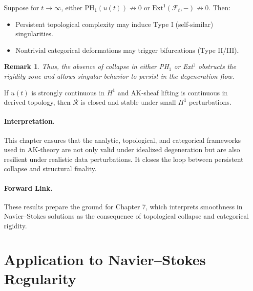 \documentclass[11pt]{article}
\newtheorem{remark}[theorem]{Remark}
\begin{document}
\begin{proposition}
Suppose for $t \to \infty$, either $\mathrm{PH}_1(u(t)) \not\to 0$ or $\mathrm{Ext}^1(\mathcal{F}_t, -) \not\to 0$. Then:

\begin{itemize}
    \item Persistent topological complexity may induce Type I (self-similar) singularities.
    \item Nontrivial categorical deformations may trigger bifurcations (Type II/III).
\end{itemize}
\end{proposition}

\begin{remark}
Thus, the absence of collapse in either PH$_1$ or Ext$^1$ obstructs the rigidity zone and allows singular behavior to persist in the degeneration flow.
\end{remark}

\begin{lemma}
If $u(t)$ is strongly continuous in $H^1$ and AK-sheaf lifting is continuous in derived topology, then $\mathcal{R}$ is closed and stable under small $H^1$ perturbations.
\end{lemma}

\paragraph{Interpretation.} 
This chapter ensures that the analytic, topological, and categorical frameworks used in AK-theory are not only valid under idealized degeneration but are also resilient under realistic data perturbations. It closes the loop between persistent collapse and structural finality.

\paragraph{Forward Link.}
These results prepare the ground for Chapter 7, which interprets smoothness in Navier–Stokes solutions as the consequence of topological collapse and categorical rigidity.



\section{Application to Navier--Stokes Regularity}
\end{document}
